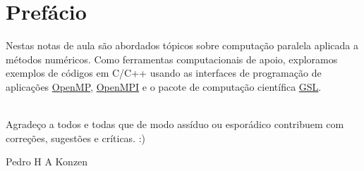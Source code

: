 
\chapter*{Prefácio}\label{prefacio}

Nestas notas de aula são abordados tópicos sobre computação paralela aplicada a métodos numéricos. Como ferramentas computacionais de apoio, exploramos exemplos de códigos em C/C++ usando as interfaces de programação de aplicações \href{https://www.openmp.org/}{OpenMP}, \href{https://www.open-mpi.org/}{OpenMPI} e o pacote de computação científica \href{https://www.gnu.org/software/gsl/}{GSL}.

~\\

Agradeço a todos e todas que de modo assíduo ou esporádico contribuem com correções, sugestões e críticas. :)

\begin{flushright}
  Pedro H A Konzen
\end{flushright}

